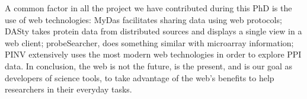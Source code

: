 A common factor in all the project we have contributed during this PhD is the use of web technologies: MyDas facilitates sharing data using web protocols; DASty takes protein data from distributed sources and displays a single view in a web client; probeSearcher, does something similar with microarray information; PINV extensively uses the most modern web technologies in order to explore PPI data. In conclusion, the web is not the future, is the present, and is our goal as developers of science tools, to take advantage of the web's benefits to help researchers in their everyday tasks.
